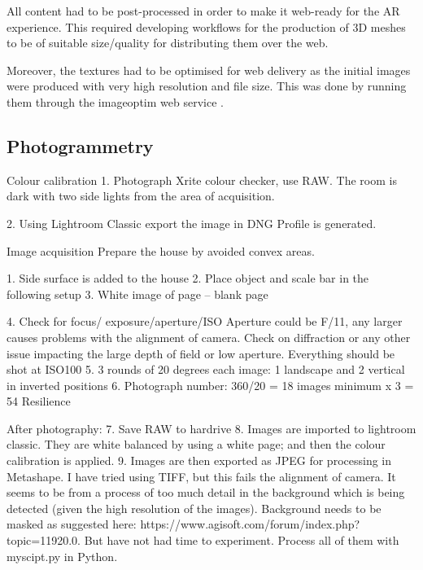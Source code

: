 \documentclass[acmlarge,screen,dvipsnames]{acmart}
\begin{document}

All content had to be post-processed in order to make it web-ready for the AR
experience. This required developing workflows for the production of 3D meshes
to be of suitable size/quality for distributing them over the web. 

Moreover, the textures had to be optimised for web delivery as the initial images were
produced with very high resolution and file size. This was done by running
them through the imageoptim web service \cite{ImageOptim}.  

\subsection{Photogrammetry}


Colour calibration
1.  Photograph Xrite colour checker, use RAW. The room is dark with two side lights from the area of acquisition.

2.  Using Lightroom Classic export the image in DNG 
Profile is generated.

Image acquisition 
Prepare the house by avoided convex areas.

1.  Side surface is added to the house
2.  Place object and scale bar in the following setup
3.  White image of page – blank page

4.  Check for focus/ exposure/aperture/ISO
Aperture could be F/11, any larger causes  problems with the alignment of camera. 
Check on diffraction or any other  issue impacting the large depth of field or low aperture.
Everything should be shot at ISO100
5.  3 rounds of 20 degrees each image: 1 landscape and 2 vertical in inverted positions
6.  Photograph  number: 360/20 = 18 images minimum x 3 = 54
Resilience

After photography:
7.  Save RAW to hardrive
8.  Images are imported to lightroom classic. They are white balanced by using a white page; and then the colour calibration is applied.
9.  Images are then exported as JPEG for processing in Metashape. I have tried using TIFF, but this fails the alignment of camera. It seems to be from a process of  too much detail in the background which is being detected (given the high resolution of the images). Background needs to be masked as suggested here: https://www.agisoft.com/forum/index.php?topic=11920.0. But have not had time to experiment.
Process all of them with myscipt.py in Python.
\end{document}
